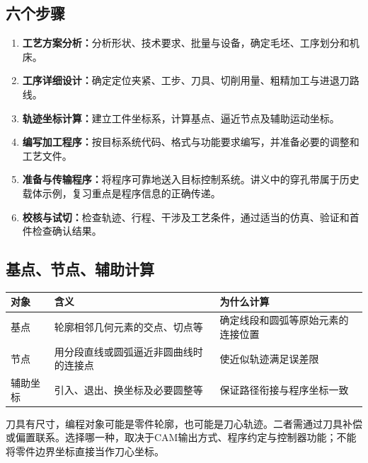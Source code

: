 \subsection{六个步骤}
\begin{enumerate}
\item \textbf{工艺方案分析：}分析形状、技术要求、批量与设备，确定毛坯、工序划分和机床。
\item \textbf{工序详细设计：}确定定位夹紧、工步、刀具、切削用量、粗精加工与进退刀路线。
\item \textbf{轨迹坐标计算：}建立工件坐标系，计算基点、逼近节点及辅助运动坐标。
\item \textbf{编写加工程序：}按目标系统代码、格式与功能要求编写，并准备必要的调整和工艺文件。
\item \textbf{准备与传输程序：}将程序可靠地送入目标控制系统。讲义中的穿孔带属于历史载体示例，复习重点是程序信息的正确传递。
\item \textbf{校核与试切：}检查轨迹、行程、干涉及工艺条件，通过适当的仿真、验证和首件检查确认结果。
\end{enumerate}

\subsection{基点、节点、辅助计算}
\begin{center}
\begin{tabularx}{\linewidth}{@{}p{.18\linewidth}XX@{}}
\toprule
对象 & 含义 & 为什么计算\\
\midrule
基点 & 轮廓相邻几何元素的交点、切点等 & 确定线段和圆弧等原始元素的连接位置\\
节点 & 用分段直线或圆弧逼近非圆曲线时的连接点 & 使近似轨迹满足误差限\\
辅助坐标 & 引入、退出、换坐标及必要圆整等 & 保证路径衔接与程序坐标一致\\
\bottomrule
\end{tabularx}
\end{center}
刀具有尺寸，编程对象可能是零件轮廓，也可能是刀心轨迹。二者需通过刀具补偿或偏置联系。选择哪一种，取决于CAM输出方式、程序约定与控制器功能；不能将零件边界坐标直接当作刀心坐标。


